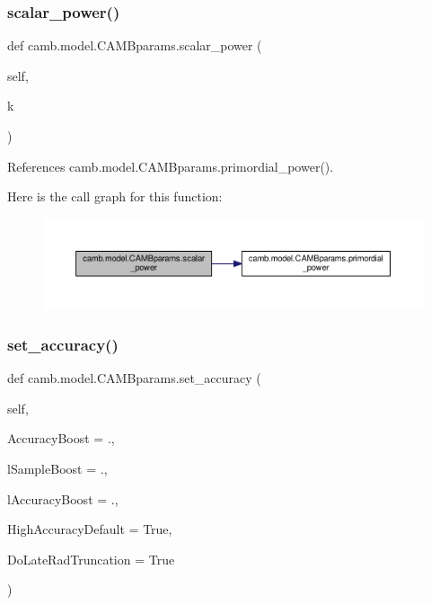 \subsubsection{\texorpdfstring{scalar\+\_\+power()}{scalar\_power()}}
{\footnotesize\ttfamily def camb.\+model.\+C\+A\+M\+Bparams.\+scalar\+\_\+power (\begin{DoxyParamCaption}\item[{}]{self,  }\item[{}]{k }\end{DoxyParamCaption})}



References camb.\+model.\+C\+A\+M\+Bparams.\+primordial\+\_\+power().

Here is the call graph for this function\+:
\nopagebreak
\begin{figure}[H]
\begin{center}
\leavevmode
\includegraphics[width=350pt]{classcamb_1_1model_1_1CAMBparams_ab0637ffdaf92a718a13b26adc99310ae_cgraph}
\end{center}
\end{figure}
\mbox{\label{classcamb_1_1model_1_1CAMBparams_a05a8e61eca1a78d1f19408dd9530672e}} 
\subsubsection{\texorpdfstring{set\+\_\+accuracy()}{set\_accuracy()}}
{\footnotesize\ttfamily def camb.\+model.\+C\+A\+M\+Bparams.\+set\+\_\+accuracy (\begin{DoxyParamCaption}\item[{}]{self,  }\item[{}]{Accuracy\+Boost = {.},  }\item[{}]{l\+Sample\+Boost = {.},  }\item[{}]{l\+Accuracy\+Boost = {.},  }\item[{}]{High\+Accuracy\+Default = {\ttfamily True},  }\item[{}]{Do\+Late\+Rad\+Truncation = {\ttfamily True} }\end{DoxyParamCaption})}

